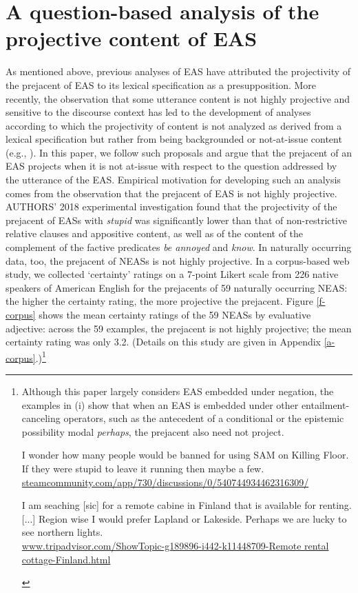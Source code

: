 \documentclass[11pt,fleqn]{article}
\newcommand{\6}{\mbox{$[\hspace*{-.6mm}[$}}
\newcommand{\9}{\mbox{$]\hspace*{-.6mm}]$}}
\begin{document}
\section{A question-based analysis of the projective content of EAS}\label{s2}

As mentioned above, previous analyses of EAS have attributed the projectivity of the prejacent of EAS to its lexical specification as a presupposition. More recently, the observation that some utterance content is not highly projective and sensitive to the discourse context has led to the development of analyses according to which the projectivity of content is not analyzed as derived from a lexical specification but rather from being backgrounded or not-at-issue content (e.g., \citealt{abrusan2011,abrusan2016,brst-salt10,best-question,brst-ar}). In this paper, we follow such proposals and argue that the prejacent of an EAS projects when it is not at-issue with respect to the question addressed by the utterance of the EAS. Empirical motivation for developing such an analysis comes from the observation that the prejacent of EAS is not highly projective.  AUTHORS' 2018 experimental investigation found that the projectivity of the prejacent of EASs with {\em stupid} was significantly lower than that of non-restrictive relative clauses and appositive content, as well as of the content of the complement of the factive predicates {\em be annoyed} and {\em know}. In naturally occurring data, too, the prejacent of NEASs is not highly projective. In a corpus-based web study, we collected `certainty' ratings on a 7-point Likert scale from 226 native speakers of American English for the prejacents of 59 naturally occurring NEAS: the higher the certainty rating, the more projective the prejacent. Figure \ref{f-corpus} shows the mean certainty ratings of the 59 NEASs by evaluative adjective: across the 59 examples, the prejacent is not highly projective; the mean certainty rating was only 3.2. (Details on this study are given in Appendix \ref{a-corpus}.)\footnote{Although this paper  largely considers EAS embedded under negation, the examples in (i) show that when an EAS is embedded under other entailment-canceling operators, such as the antecedent of a conditional or the epistemic possibility modal {\em perhaps}, the prejacent also need not project. 

\begin{exe}
\begin{xlist}
\ex 
\begin{xlist}
 I wonder how many people would be banned for using SAM on Killing Floor.
 If they were stupid to leave it running then maybe a few.\\ \url{steamcommunity.com/app/730/discussions/0/540744934462316309/}
\end{xlist}
\ex I am seaching [sic] for a remote cabine in Finland that is available for renting. [...]
Region wise I would prefer Lapland or Lakeside. Perhaps we are lucky to see northern lights. \\ \url{www.tripadvisor.com/ShowTopic-g189896-i442-k11448709-Remote rental cottage-Finland.html}

\end{xlist}
\end{exe}
}
\end{document}
